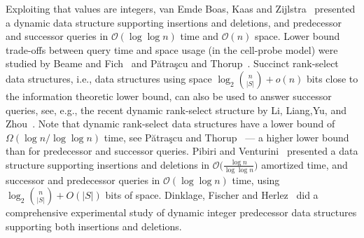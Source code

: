 \documentclass[a4paper]{lipics-v2021}
\newcommand{\Oh}{\mathcal{O}}
\begin{document}
Exploiting that values are integers, van Emde Boas, Kaas and Zijlstra~\cite{Boas77,BoasKaasZijlstra77} presented a dynamic data structure supporting insertions and deletions, and predecessor and successor queries in $\Oh(\log\log n)$ time and $\Oh(n)$ space. Lower bound trade-offs between query time and space usage (in the cell-probe model) were studied by Beame and Fich~\cite{BeameFich02} and P{\u{a}}tra{\c{s}}cu and Thorup~\cite{PatrascuThorup06}. Succinct rank-select data structures, i.e., data structures using space $\log_2 \binom{n}{|S|}+o(n)$ bits close to the information theoretic lower bound, can also be used to answer successor queries, see, e.g., the recent dynamic rank-select structure by Li, Liang,Yu, and Zhou~\cite{LiLiangYuZhou23}. Note that dynamic rank-select data structures have a lower bound of $\Omega(\log n/\log\log n)$ time, see P{\u{a}}tra{\c{s}}cu and Thorup~\cite{PatrascuThorup14} --- a higher lower bound than for predecessor and successor queries. Pibiri and Venturini~\cite{PibiriVenturini17} presented a data structure supporting insertions and deletions in $\Oh\bigl(\frac{\log n}{\log\log n}\bigr)$ amortized time, and successor and predecessor queries in $\Oh(\log\log n)$ time, using $\log_2 \binom{n}{|S|}+O(|S|)$ bits of space. Dinklage, Fischer and Herlez~\cite{DinklageFH21} did a comprehensive experimental study of dynamic integer predecessor data structures supporting both insertions and deletions.
\end{document}
